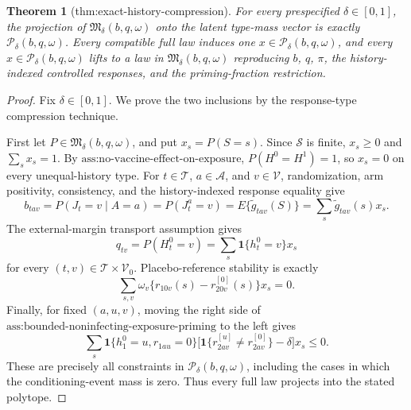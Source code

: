 \documentclass{article}
\newtheorem{theorem}{Theorem}
\begin{document}
\begin{theorem}[thm:exact-history-compression]\label{thm:exact-history-compression}
For every prespecified \(\delta\in[0,1]\), the projection of \(\mathfrak M_\delta(b,q,\omega)\) onto the latent type-mass vector is exactly \(\mathcal P_\delta(b,q,\omega)\). Every compatible full law induces one \(x\in\mathcal P_\delta(b,q,\omega)\), and every \(x\in\mathcal P_\delta(b,q,\omega)\) lifts to a law in \(\mathfrak M_\delta(b,q,\omega)\) reproducing \(b\), \(q\), \(\pi\), the history-indexed controlled responses, and the priming-fraction restriction.
\end{theorem}
\begin{proof}
Fix \(\delta\in[0,1]\).  We prove the two inclusions by the response-type compression technique.

First let \(P\in\mathfrak M_\delta(b,q,\omega)\), and put \(x_s=P(S=s)\).  Since \(\mathcal S\) is finite, \(x_s\geq0\) and \(\sum_sx_s=1\).  By \(\text{ass:no-vaccine-effect-on-exposure}\), \(P(H^0=H^1)=1\), so \(x_s=0\) on every unequal-history type.  For \(t\in\mathcal T\), \(a\in\mathcal A\), and \(v\in\mathcal V\), randomization, arm positivity, consistency, and the history-indexed response equality give
\[
b_{tav}=P(J_t=v\mid A=a)=P(J_t^a=v)=E\{\widetilde g_{tav}(S)\}=\sum_s\widetilde g_{tav}(s)x_s.
\]
The external-margin transport assumption gives
\[
q_{tv}=P(H_t^0=v)=\sum_s\mathbf 1\{h_t^0=v\}x_s
\]
for every \((t,v)\in\mathcal T\times\mathcal V_0\).  Placebo-reference stability is exactly
\[
\sum_{s,v}\omega_v\{r_{10v}(s)-r^{[0]}_{20v}(s)\}x_s=0.
\]
Finally, for fixed \((a,u,v)\), moving the right side of \(\text{ass:bounded-noninfecting-exposure-priming}\) to the left gives
\[
\sum_s\mathbf 1\{h_1^0=u,r_{1au}=0\}
 \bigl[\mathbf 1\{r^{[u]}_{2av}\ne r^{[0]}_{2av}\}-\delta\bigr]x_s\leq0.
\]
These are precisely all constraints in \(\mathcal P_\delta(b,q,\omega)\), including the cases in which the conditioning-event mass is zero.  Thus every full law projects into the stated polytope.


\end{proof}
\end{document}
